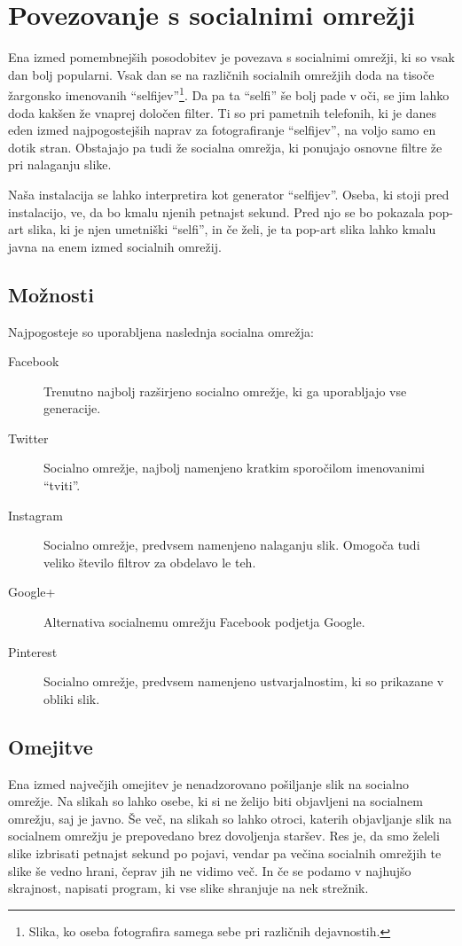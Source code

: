 \chapter{Povezovanje s socialnimi omrežji}
\label{ch:social_network}
Ena izmed pomembnejših posodobitev je povezava s socialnimi omrežji, ki so
vsak dan bolj popularni. Vsak dan se na različnih socialnih omrežjih doda na
tisoče žargonsko imenovanih ``selfijev''\footnote{Slika, ko oseba fotografira
samega sebe pri različnih dejavnostih.}. Da pa ta ``selfi'' še bolj pade v
oči, se jim lahko doda kakšen že vnaprej določen filter. Ti so pri pametnih
telefonih, ki je danes eden izmed najpogostejših naprav za fotografiranje
``selfijev'', na voljo samo en dotik stran. Obstajajo pa tudi že socialna
omrežja, ki ponujajo osnovne filtre že pri nalaganju slike.

Naša instalacija se lahko interpretira kot generator ``selfijev''. Oseba, ki stoji pred
instalacijo, ve, da bo kmalu njenih petnajst sekund. Pred njo se bo pokazala
pop-art slika, ki je njen umetniški ``selfi'', in če želi, je ta pop-art slika
lahko kmalu javna na enem izmed socialnih omrežij.


\section{Možnosti}
Najpogosteje so uporabljena naslednja socialna omrežja:
\begin{description}
\item[Facebook] Trenutno najbolj razširjeno socialno omrežje, ki ga uporabljajo vse generacije.
\item[Twitter] Socialno omrežje, najbolj namenjeno kratkim sporočilom imenovanimi ``tviti''.
\item[Instagram] Socialno omrežje, predvsem namenjeno nalaganju slik. Omogoča tudi veliko število filtrov za obdelavo le teh.
\item[Google+] Alternativa socialnemu omrežju Facebook podjetja Google.
\item[Pinterest] Socialno omrežje, predvsem namenjeno ustvarjalnostim, ki so prikazane v obliki slik.
\end{description}


\section{Omejitve}
Ena izmed največjih omejitev je nenadzorovano pošiljanje slik na socialno
omrežje. Na slikah so lahko osebe, ki si ne želijo biti objavljeni na
socialnem omrežju, saj je javno. Še več, na slikah so lahko otroci, katerih
objavljanje slik na socialnem omrežju je prepovedano brez dovoljenja staršev.
Res je, da smo želeli slike izbrisati petnajst sekund po pojavi, vendar pa
večina socialnih omrežjih te slike še vedno hrani, čeprav jih ne vidimo več.
In če se podamo v najhujšo skrajnost, napisati program, ki vse slike shranjuje
na nek strežnik.


